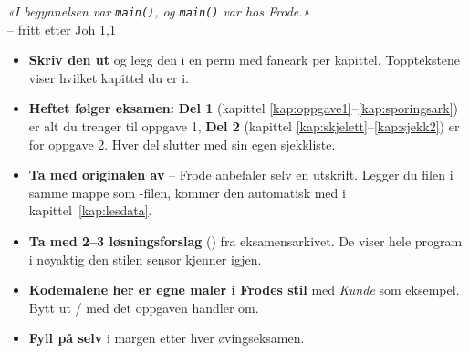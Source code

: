 \begin{titlepage}
\end{titlepage}
\hypersetup{pageanchor=true}

\thispagestyle{empty}
\vspace*{1.5cm}
\begin{flushright}
{\selectfont\Large\itshape «I begynnelsen var \texttt{main()}, og \texttt{main()} var hos Frode.»}\\[4pt]
{\selectfont\small -- fritt etter Joh 1,1}
\end{flushright}
\vspace{1.5cm}

\begin{regel}
\begin{itemize}
  \item \textbf{Skriv den ut} og legg den i en perm med faneark per kapittel. Topptekstene viser hvilket kapittel du er i.
  \item \textbf{Heftet følger eksamen:} \textbf{Del 1} (kapittel \ref{kap:oppgave1}--\ref{kap:sporingsark}) er alt du trenger til oppgave 1, \textbf{Del 2} (kapittel \ref{kap:skjelett}--\ref{kap:sjekk2}) er for oppgave 2. Hver del slutter med sin egen sjekkliste.
  \item \textbf{Ta med originalen av } -- Frode anbefaler selv en utskrift. Legger du filen i samme mappe som -filen, kommer den automatisk med i kapittel~\ref{kap:lesdata}.
  \item \textbf{Ta med 2--3 løsningsforslag} () fra eksamensarkivet. De viser hele program i nøyaktig den stilen sensor kjenner igjen.
  \item \textbf{Kodemalene her er egne maler i Frodes stil} med \emph{Kunde} som eksempel. Bytt ut / med det oppgaven handler om.
  \item \textbf{Fyll på selv} i margen etter hver øvingseksamen.
\end{itemize}
\end{regel}

